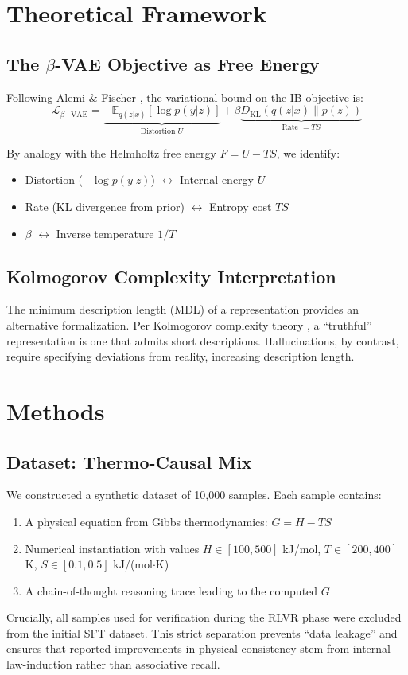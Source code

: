 \documentclass{article}
\begin{document}
\section{Theoretical Framework}

\subsection{The $\beta$-VAE Objective as Free Energy}
Following Alemi \& Fischer \cite[Eq. 4]{Alemi2017DeepVIB}, the variational bound on the IB objective is:
\begin{equation}
    \mathcal{L}_{\beta\mathrm{-VAE}} = \underbrace{-\mathbb{E}_{q(z|x)}[\log p(y|z)]}_{\text{Distortion } U} + \beta \underbrace{D_{\mathrm{KL}}(q(z|x) \| p(z))}_{\text{Rate } = TS}
    \label{eq:vae}
\end{equation}

By analogy with the Helmholtz free energy $F = U - TS$, we identify:
\begin{itemize}
    \item Distortion ($-\log p(y|z)$) $\leftrightarrow$ Internal energy $U$
    \item Rate (KL divergence from prior) $\leftrightarrow$ Entropy cost $TS$
    \item $\beta$ $\leftrightarrow$ Inverse temperature $1/T$
\end{itemize}

\subsection{Kolmogorov Complexity Interpretation}
The minimum description length (MDL) of a representation provides an alternative formalization. Per Kolmogorov complexity theory \cite[Chapter 2]{LiVitanyi2008}, a ``truthful'' representation is one that admits short descriptions. Hallucinations, by contrast, require specifying deviations from reality, increasing description length.

\section{Methods}

\subsection{Dataset: Thermo-Causal Mix}
We constructed a synthetic dataset of 10,000 samples. Each sample contains:
\begin{enumerate}
    \item A physical equation from Gibbs thermodynamics: $G = H - TS$
    \item Numerical instantiation with values $H \in [100, 500]$ kJ/mol, $T \in [200, 400]$ K, $S \in [0.1, 0.5]$ kJ/(mol$\cdot$K)
    \item A chain-of-thought reasoning trace leading to the computed $G$
\end{enumerate}
Crucially, all samples used for verification during the RLVR phase were excluded from the initial SFT dataset. This strict separation prevents ``data leakage'' and ensures that reported improvements in physical consistency stem from internal law-induction rather than associative recall.
\end{document}
